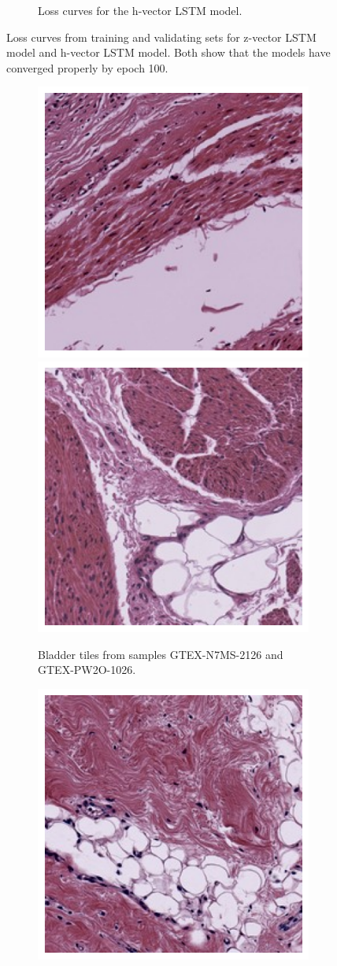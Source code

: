 \documentclass{l4proj}
\begin{document}
\begin{appendices}
\begin{figure}
\begin{subfigure}[b]{0.45\textwidth}
        \caption{Loss curves for the h-vector LSTM model.}
        \label{fig:loss_h_vec}
    \end{subfigure}
    \caption{Loss curves from training and validating sets for  z-vector LSTM model and  h-vector LSTM model. Both show that the models have converged properly by epoch 100.}
\end{figure}

\begin{figure}
    \centering
    \begin{subfigure}[b]{\textwidth}
        \includegraphics[width=0.45\linewidth]{images/bladder1_1s.png}
        \includegraphics[width=0.45\linewidth]{images/bladder2_1s.png}
        \caption{Bladder tiles from samples GTEX-N7MS-2126 and GTEX-PW2O-1026.}
        \label{fig:leiden1_bladder}
        \vspace{1in}
    \end{subfigure}
    \begin{subfigure}[b]{\textwidth}
        \includegraphics[width=0.45\linewidth]{images/breast1_1s.png}

\end{subfigure}
\end{figure}
\end{appendices}
\end{document}
